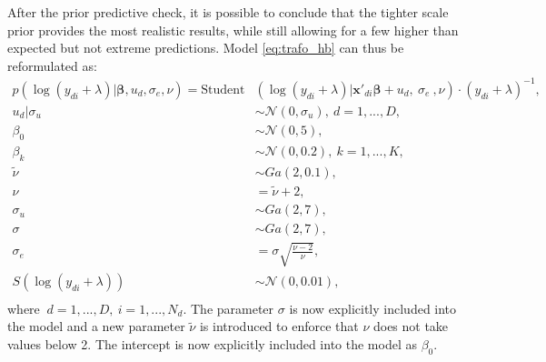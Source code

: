 After the prior predictive check, it is possible to conclude that the tighter scale prior provides the most realistic results, while still allowing for a few higher than expected but not extreme predictions.
Model \ref{eq:trafo_hb} can thus be reformulated as:
\begin{equation}
    \begin{split}
        p(\log(y_{di} + \lambda) |\boldsymbol \beta, u_d, \sigma_e, \nu)   =        \text{Student}&(\log(y_{di} + \lambda)| \boldsymbol{x'}_{di} \boldsymbol \beta + u_d,\ \sigma_e\ , \nu)\cdot (y_{di} + \lambda)^{-1}, \\
        u_d | \sigma_u & \sim \mathcal N(0, \sigma_u),\ d = 1, ..., D, \\
        \beta_0 & \sim \mathcal N (0, 5),\\
        \beta_k & \sim \mathcal N(0, 0.2),\ k = 1, ..., K,\\
        \tilde \nu & \sim Ga(2, 0.1), \\
        \nu & = \tilde \nu + 2,\\
        \sigma_u & \sim Ga(2, 7), \\
        \sigma & \sim Ga(2, 7), \\
        \sigma_e & = \sigma \sqrt{\frac{\nu - 2}{\nu}},\\
        S(\log(y_{di} + \lambda)) & \sim \mathcal N(0, 0.01),\\
    \end{split}
    \label{eq:trafo_coef_var}
\end{equation}
where $\ d = 1, ..., D,\ i = 1, ..., N_d$. The parameter $\sigma$ is now explicitly included into the model and a new parameter $\tilde \nu$ is introduced to enforce that $\nu$ does not take values below 2. The intercept is now explicitly included into the model as $\beta_0$.






